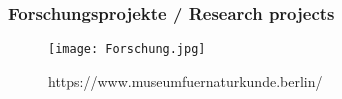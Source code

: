 \documentclass[13pt]{beamer}
\begin{document}
\begin{frame}
  \frametitle{Forschungsprojekte / \textcolor{mfn_green}{Research projects}}
  \begin{figure}
  \texttt{[image: Forschung.jpg]}
  \caption{https://www.museumfuernaturkunde.berlin/}
  \end{figure}
\end{frame}
\end{document}
